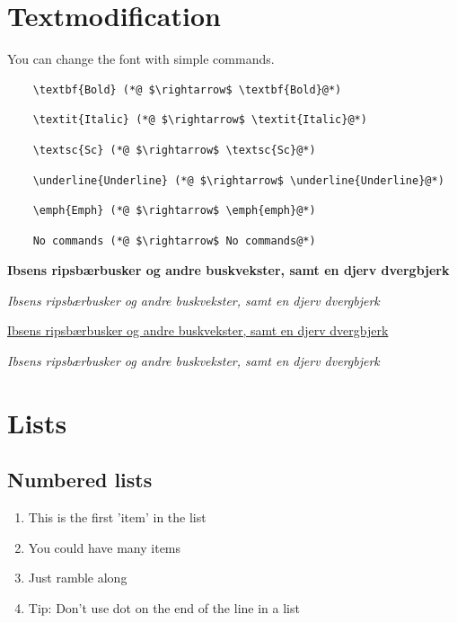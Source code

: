 \section{Textmodification}
You can change the font with simple commands.\newline{}
\begin{lstlisting}
	\textbf{Bold} (*@ $\rightarrow$ \textbf{Bold}@*)
\end{lstlisting}
\begin{lstlisting}
	\textit{Italic} (*@ $\rightarrow$ \textit{Italic}@*)
\end{lstlisting}
\begin{lstlisting}
	\textsc{Sc} (*@ $\rightarrow$ \textsc{Sc}@*)
\end{lstlisting}
\begin{lstlisting}
	\underline{Underline} (*@ $\rightarrow$ \underline{Underline}@*)
\end{lstlisting}
\begin{lstlisting}
	\emph{Emph} (*@ $\rightarrow$ \emph{emph}@*)
\end{lstlisting}
\begin{lstlisting}
	No commands (*@ $\rightarrow$ No commands@*)
\end{lstlisting}

\textbf{Ibsens ripsbærbusker og andre buskvekster, samt en djerv dvergbjerk}

\textit{Ibsens ripsbærbusker og andre buskvekster, samt en djerv dvergbjerk}

\underline{Ibsens ripsbærbusker og andre buskvekster, samt en djerv dvergbjerk}

\emph{Ibsens ripsbærbusker og andre buskvekster, samt en djerv dvergbjerk}

\section{Lists}
\subsection{Numbered lists}
\begin{enumerate}
	\item This is the first 'item' in the list
	\item You could have many items
	\item Just ramble along
	\item Tip: Don't use dot on the end of the line in a list
\end{enumerate}


